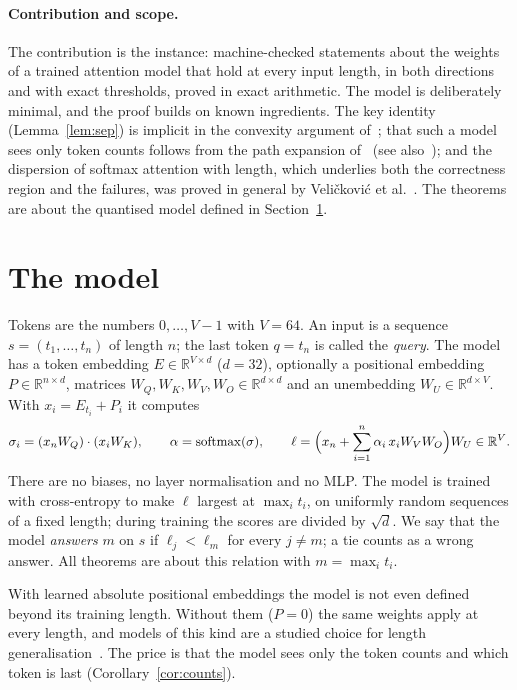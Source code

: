 \documentclass[11pt,a4paper]{article}
\newcommand{\R}{\mathbb{R}}
\begin{document}
\paragraph{Contribution and scope.}
The contribution is the instance: machine-checked statements about the weights
of a trained attention model that hold at every input length, in both
directions and with exact thresholds, proved in exact arithmetic. The model is
deliberately minimal, and the proof builds on known ingredients. The key
identity (Lemma~\ref{lem:sep}) is implicit in the convexity argument
of~\cite{gross2024compact}; that such a model sees only token counts follows
from the path expansion of~\cite{elhage2021mathematical} (see
also~\cite{salzer2026counting}); and the dispersion of softmax attention with
length, which underlies both the correctness region and the failures, was
proved in general by Veli\v{c}kovi\'c et al.~\cite{velickovic2025softmax}. The
theorems are about the quantised model defined in Section~\ref{sec:model}.

\section{The model}\label{sec:model}

Tokens are the numbers $0,\dots,V-1$ with $V=64$. An input is a sequence
$s=(t_1,\dots,t_n)$ of length $n$; the last token $q=t_n$ is called the
\emph{query}. The model has a token embedding $E\in\R^{V\times d}$ ($d=32$),
optionally a positional embedding $P\in\R^{n\times d}$, matrices
$W_Q,W_K,W_V,W_O\in\R^{d\times d}$ and an unembedding $W_U\in\R^{d\times V}$.
With $x_i=E_{t_i}+P_i$ it computes
\[
 \sigma_i=(x_nW_Q)\cdot(x_iW_K),\qquad
 \alpha=\operatorname{softmax}(\sigma),\qquad
 \ell=\Bigl(x_n+\sum_{i=1}^n \alpha_i\,x_iW_VW_O\Bigr)W_U\in\R^V .
\]
There are no biases, no layer normalisation and no MLP. The model is trained
with cross-entropy to make $\ell$ largest at $\max_i t_i$, on uniformly random
sequences of a fixed length; during training the scores are divided by
$\sqrt d$. We say that the model \emph{answers} $m$ on $s$ if $\ell_j<\ell_m$
for every $j\ne m$; a tie counts as a wrong answer. All theorems are about this
relation with $m=\max_i t_i$.

With learned absolute positional embeddings the model is not even defined beyond
its training length. Without them ($P=0$) the same weights apply at every
length, and models of this kind are a studied choice for length
generalisation~\cite{kazemnejad2023nope}. The price is that the model sees only
the token counts and which token is last (Corollary~\ref{cor:counts}).
\end{document}
